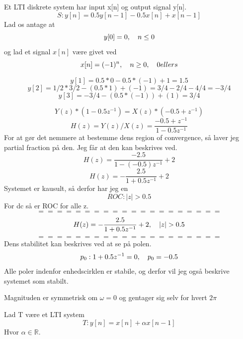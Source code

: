 \begin{EksamensOpgaver}
\begin{Eksamenssæt}[2024 Ordinær]
\begin{eksamensOpgave}
\begin{UnderOpgave}
            \end{UnderOpgave}
        \end{eksamensOpgave}
        \begin{eksamensOpgave}
            Et LTI diskrete system har input x[n] og output signal y[n]. 
            \[S: y[n] = 0.5 y[n - 1] - 0.5 x[n] + x[n - 1]\]
            Lad os antage at 
            \[y[0] = 0, \tab{0} n \leq 0\]
            og lad et signal $x[n]$ være givet ved 
            \[x[n] = (-1)^n, \tab{0} n \geq 0, \tab{0} 0 ellers\]
            \begin{UnderOpgave}[Beregn for n = 1, 2, 3]
                \[y[1] = 0.5 * 0 - 0.5*(-1) + 1 = 1.5\]
                \[y[2] = 1/2 * 3/2 - (0.5 * 1) + (-1) = 3/4 - 2/4 - 4/4 = -3/4\]
                \[y[3] = -3/4 - (0.5 * (-1)) + (1) = 3/4\]
            \end{UnderOpgave}        
            \begin{UnderOpgave}
                \[Y(z) * (1 - 0.5z^{-1}) = X(z) * (-0.5 + z^{-1})\]
                \[H(z) = Y(z)/X(z) = \frac{-0.5 + z^{-1}}{1 - 0.5z^{-1}}\]
                For at gør det nemmere at bestemme dens region of convergence, så laver jeg partial fraction på den. 
                Jeg får at den kan beskrives ved. 
                \[H(z) = \frac{-2.5}{1 - (-0.5)z^{-1}} + 2\]
                \[H(z) = -\frac{2.5}{1 + 0.5z^{-1}} + 2\]
                Systemet er kausult, så derfor har jeg en 
                \[ROC: |z| > 0.5\]
                For dc så er ROC for alle z. 
                \[====================\]
                \[H(z) = -\frac{2.5}{1 + 0.5z^{-1}} + 2, \tab{0} |z| > 0.5\]
                \[====================\]
                Dens stabilitet kan beskrives ved at se på polen. 
                \[p_0: 1 + 0.5z^{-1} = 0, \tab{0} p_0 = -0.5\]
                Alle poler indenfor enhedscirklen er stabile, og derfor vil jeg også beskrive systemet som stabilt. 
            \end{UnderOpgave}
            \begin{UnderOpgave}
                Magnituden er symmetrisk om $\omega = 0$ og gentager sig selv for hvert $2\pi$
            \end{UnderOpgave}
            Lad T være et LTI system
            \[T: y[n] = x[n] + \alpha x[n - 1]\]
            Hvor $\alpha \in \mathbb{R}$. 

\end{eksamensOpgave}
\end{Eksamenssæt}
\end{EksamensOpgaver}
